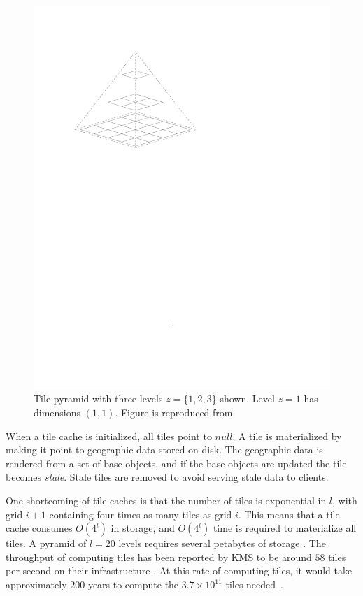 \documentclass[11pt, oneside]{report}
\begin{document}
{\begin{figure}
\centering
\includegraphics[scale=0.8]{figs-tileheat/tilepyramid}
\caption{Tile pyramid with three levels $z=\{1, 2, 3\}$ shown. Level $z=1$ has dimensions $(1,1)$. Figure is reproduced from \cite{quinn2010prediction}}
\label{fig:tilepyramid}
\end{figure}

When a tile cache is initialized, all tiles point to $null$. A tile is materialized by making it point to geographic data stored on disk. The geographic data is rendered from a set of base objects, and if the base objects are updated the tile becomes \emph{stale}. Stale tiles are removed to avoid serving stale data to clients.

One shortcoming of tile caches is that the number of tiles is exponential in $l$, with grid $i+1$ containing four times as many tiles as grid $i$. This means that a tile cache consumes $O(4^l)$ in storage, and $O(4^l)$ time is required to materialize all tiles. A pyramid of $l=20$ levels requires several petabytes of storage \cite{garcia2011adaptive}. The throughput of computing tiles has been reported by KMS to be around $58$ tiles per second on their infrastructure \cite{lindegaard12}. At this rate of computing tiles, it would take approximately $200$ years to compute the $3.7 \times 10^{11}$ tiles needed~\cite{garcia2011adaptive}.

}
\end{document}
